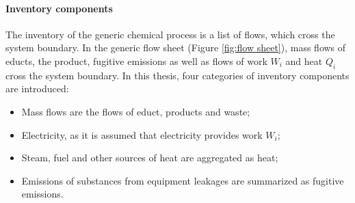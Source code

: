 
\paragraph{Inventory components}The inventory of the generic chemical process is a list of flows, which cross the system boundary. In the generic flow sheet (Figure \ref{fig:flow sheet}), mass flows of educts, the product, fugitive emissions as well as flows of work $W_i$ and heat $Q_i$ cross the system boundary. In this thesis, four categories of inventory components are introduced: 
\begin{itemize}
    \item Mass flows are the flows of educt, products and waste;
    \item Electricity, as it is assumed that electricity provides work $W_i$;  
    \item Steam, fuel and other sources of heat are aggregated as heat;
    \item Emissions of substances from equipment leakages are summarized as fugitive emissions.
\end{itemize}

